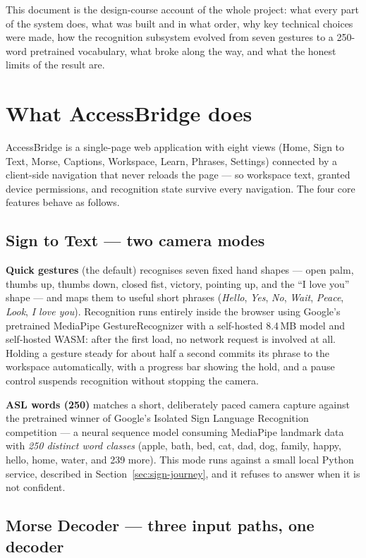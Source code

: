 \documentclass[11pt,a4paper]{article}
\begin{document}
This document is the design-course account of the whole project: what every part of the system does, what was built and in what order, why key technical choices were made, how the recognition subsystem evolved from seven gestures to a 250-word pretrained vocabulary, what broke along the way, and what the honest limits of the result are.

\section{What AccessBridge does}

AccessBridge is a single-page web application with eight views (Home, Sign to Text, Morse, Captions, Workspace, Learn, Phrases, Settings) connected by a client-side navigation that never reloads the page --- so workspace text, granted device permissions, and recognition state survive every navigation. The four core features behave as follows.

\subsection{Sign to Text --- two camera modes}

\textbf{Quick gestures} (the default) recognises seven fixed hand shapes --- open palm, thumbs up, thumbs down, closed fist, victory, pointing up, and the ``I love you'' shape --- and maps them to useful short phrases (\emph{Hello}, \emph{Yes}, \emph{No}, \emph{Wait}, \emph{Peace}, \emph{Look}, \emph{I love you}). Recognition runs entirely inside the browser using Google's pretrained MediaPipe GestureRecognizer with a self-hosted 8.4\,MB model and self-hosted WASM: after the first load, no network request is involved at all. Holding a gesture steady for about half a second commits its phrase to the workspace automatically, with a progress bar showing the hold, and a pause control suspends recognition without stopping the camera.

\textbf{ASL words (250)} matches a short, deliberately paced camera capture against the pretrained winner of Google's Isolated Sign Language Recognition competition --- a neural sequence model consuming MediaPipe landmark data with \emph{250 distinct word classes} (apple, bath, bed, cat, dad, dog, family, happy, hello, home, water, and 239 more). This mode runs against a small local Python service, described in Section~\ref{sec:sign-journey}, and it refuses to answer when it is not confident.

\subsection{Morse Decoder --- three input paths, one decoder}
\end{document}
